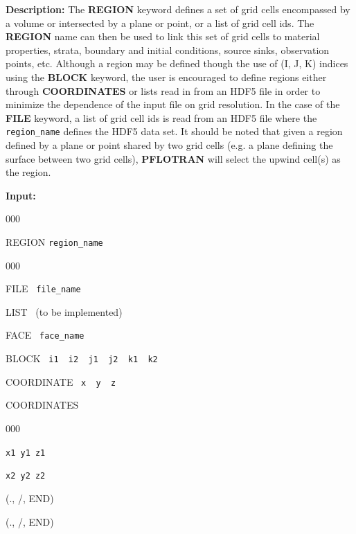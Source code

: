 \documentclass[12pt]{article}
\begin{document}
{\noindent\bf Description:}
The {\bf REGION} keyword defines a set of grid cells encompassed by a volume or intersected by a plane or point, or a list of grid cell ids.  The {\bf REGION} name can then be used to link this set of grid cells to material properties, strata, boundary and initial conditions, source sinks, observation points, etc.  Although a region may be defined though the use of (I, J, K) indices using the {\bf BLOCK} keyword, the user is encouraged to define regions either through {\bf COORDINATES} or lists read in from an HDF5 file in order to minimize the dependence of the input file on grid resolution.  In the case of the {\bf FILE} keyword, a list of grid cell ids is read from an HDF5 file where the {\tt region\_name} defines the HDF5 data set.  It should be noted that given a region defined by a plane or point shared by two grid cells (e.g. a plane defining the surface between two grid cells), {\bf PFLOTRAN} will select the upwind cell(s) as the region.

{\noindent\bf Input:}

\begin{deflist}{000}
\item[REGION] {\tt region\_name}
\begin{deflist}{000}
\item[FILE] \ {\tt file\_name}
\item[LIST] \ (to be implemented)
\item[FACE] \ {\tt face\_name}
\item[BLOCK] \ {\tt i1 \ i2 \ j1 \ j2 \ k1 \ k2}
\item[COORDINATE] \ {\tt x \ y \ z}
\item[COORDINATES] ~
\begin{deflist}{000}
\item[\tt x1 y1 z1]
\item[\tt x2 y2 z2]
\end{deflist}
\item[(., /, END)]
\end{deflist}
\item[(., /, END)]
\end{deflist}
\end{document}
